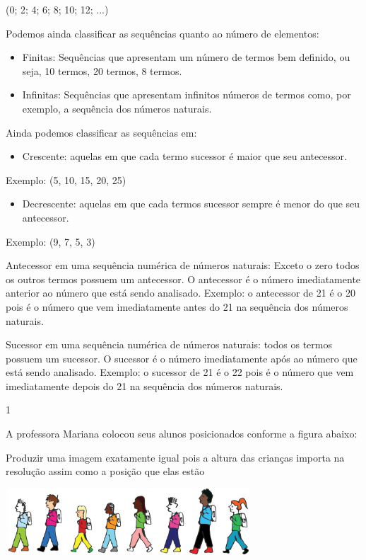 \begin{escolha}
(0; 2; 4; 6; 8; 10; 12; ...)

Podemos ainda classificar as sequências quanto ao número de elementos:

\begin{itemize}
\item
  Finitas: Sequências que apresentam um número de termos bem definido,
  ou seja, 10 termos, 20 termos, 8 termos.
\item
  Infinitas: Sequências que apresentam infinitos números de termos como,
  por exemplo, a sequência dos números naturais.
\end{itemize}

Ainda podemos classificar as sequências em:

\begin{itemize}
\item
  Crescente: aquelas em que cada termo sucessor é maior que seu
  antecessor.
\end{itemize}

Exemplo: (5, 10, 15, 20, 25)

\begin{itemize}
\item
  Decrescente: aquelas em que cada termos sucessor sempre é menor do que
  seu antecessor.
\end{itemize}

Exemplo: (9, 7, 5, 3)

Antecessor em uma sequência numérica de números naturais: Exceto o zero
todos os outros termos possuem um antecessor. O antecessor é o número
imediatamente anterior ao número que está sendo analisado. Exemplo: o
antecessor de 21 é o 20 pois é o número que vem imediatamente antes do
21 na sequência dos números naturais.

Sucessor em uma sequência numérica de números naturais: todos os termos
possuem um sucessor. O sucessor é o número imediatamente após ao número
que está sendo analisado. Exemplo: o sucessor de 21 é o 22 pois é o
número que vem imediatamente depois do 21 na sequência dos números
naturais.


\num{1}

A professora Mariana colocou seus alunos posicionados conforme a figura
abaixo:

Produzir uma imagem exatamente igual pois a altura das crianças importa
na resolução assim como a posição que elas estão

\includegraphics[width=3.62531in,height=0.96675in]{media/image27.png}


\end{escolha}
